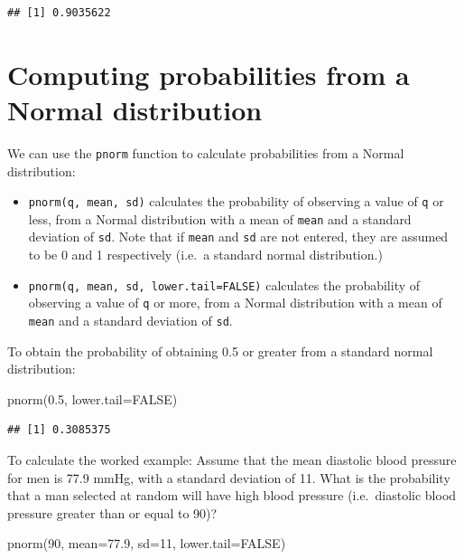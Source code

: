 \documentclass[
]{memoir}
\newenvironment{Shaded}{\begin{snugshade}}{\end{snugshade}}
\newcommand{\AttributeTok}[1]{\textcolor[rgb]{0.77,0.63,0.00}{#1}}
\newcommand{\ConstantTok}[1]{\textcolor[rgb]{0.00,0.00,0.00}{#1}}
\newcommand{\DecValTok}[1]{\textcolor[rgb]{0.00,0.00,0.81}{#1}}
\newcommand{\FloatTok}[1]{\textcolor[rgb]{0.00,0.00,0.81}{#1}}
\newcommand{\FunctionTok}[1]{\textcolor[rgb]{0.00,0.00,0.00}{#1}}
\newcommand{\NormalTok}[1]{#1}
\providecommand{\tightlist}{%
  \setlength{\itemsep}{0pt}\setlength{\parskip}{0pt}}
\begin{document}
\begin{verbatim}
## [1] 0.9035622
\end{verbatim}

\hypertarget{computing-probabilities-from-a-normal-distribution}{%
\section{Computing probabilities from a Normal distribution}\label{computing-probabilities-from-a-normal-distribution}}

We can use the \texttt{pnorm} function to calculate probabilities from a Normal distribution:

\begin{itemize}
\tightlist
\item
  \texttt{pnorm(q,\ mean,\ sd)} calculates the probability of observing a value of \texttt{q} or less, from a Normal distribution with a mean of \texttt{mean} and a standard deviation of \texttt{sd}. Note that if \texttt{mean} and \texttt{sd} are not entered, they are assumed to be 0 and 1 respectively (i.e.~a standard normal distribution.)
\item
  \texttt{pnorm(q,\ mean,\ sd,\ lower.tail=FALSE)} calculates the probability of observing a value of \texttt{q} or more, from a Normal distribution with a mean of \texttt{mean} and a standard deviation of \texttt{sd}.
\end{itemize}

To obtain the probability of obtaining 0.5 or greater from a standard normal distribution:

\begin{Shaded}
\begin{Highlighting}[]
\FunctionTok{pnorm}\NormalTok{(}\FloatTok{0.5}\NormalTok{, }\AttributeTok{lower.tail=}\ConstantTok{FALSE}\NormalTok{)}
\end{Highlighting}
\end{Shaded}

\begin{verbatim}
## [1] 0.3085375
\end{verbatim}

To calculate the worked example: Assume that the mean diastolic blood pressure for men is 77.9 mmHg, with a standard deviation of 11. What is the probability that a man selected at random will have high blood pressure (i.e.~diastolic blood pressure greater than or equal to 90)?

\begin{Shaded}
\begin{Highlighting}[]
\FunctionTok{pnorm}\NormalTok{(}\DecValTok{90}\NormalTok{, }\AttributeTok{mean=}\FloatTok{77.9}\NormalTok{, }\AttributeTok{sd=}\DecValTok{11}\NormalTok{, }\AttributeTok{lower.tail=}\ConstantTok{FALSE}\NormalTok{)}
\end{Highlighting}
\end{Shaded}
\end{document}
